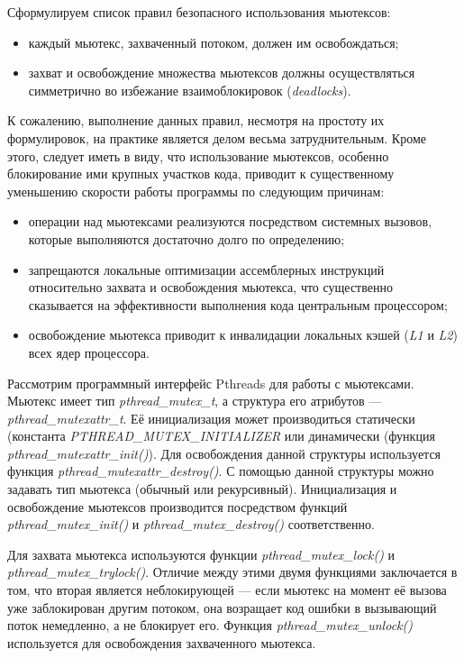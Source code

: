 Сформулируем список правил безопасного использования мьютексов:
\begin{itemize}
\item каждый мьютекс, захваченный потоком, должен им освобождаться;
\item захват и освобождение множества мьютексов должны осуществляться симметрично
  во избежание взаимоблокировок (\textit{deadlocks}).
\end{itemize}

К сожалению, выполнение данных правил, несмотря на простоту их формулировок,
на практике является делом весьма затруднительным.
Кроме этого, следует иметь в виду, что использование мьютексов,
особенно блокирование ими крупных участков кода, приводит к существенному
уменьшению скорости работы программы по следующим причинам:
\begin{itemize}
\item операции над мьютексами реализуются посредством системных вызовов,
  которые выполняются достаточно долго по определению;
\item запрещаются локальные оптимизации ассемблерных инструкций
  относительно захвата и освобождения мьютекса,
  что существенно сказывается на эффективности выполнения кода
  центральным процессором;
\item освобождение мьютекса приводит к инвалидации локальных кэшей
  (\textit{L1} и \textit{L2}) всех ядер процессора.
\end{itemize}

Рассмотрим программный интерфейс Pthreads для работы с мьютексами.
Мьютекс имеет тип \textit{pthread\_mutex\_t}, а структура его атрибутов ---
\textit{pthread\_mutexattr\_t}.
Её инициализация может производиться статически
(константа \textit{PTHREAD\_MUTEX\_INITIALIZER} или динамически
(функция \textit{pthread\_mutexattr\_init()}).
Для освобождения данной структуры используется функция
\textit{pthread\_mutexattr\_destroy()}.
С помощью данной структуры можно задавать тип мьютекса (обычный или рекурсивный).
Инициализация и освобождение мьютексов производится посредством
функций \textit{pthread\_mutex\_init()} и \textit{pthread\_mutex\_destroy()}
соответственно.

Для захвата мьютекса используются функции \textit{pthread\_mutex\_lock()}
и \textit{pthread\_mutex\_trylock()}. Отличие между этими двумя функциями
заключается в том, что вторая является неблокирующей --- если мьютекс на момент
её вызова уже заблокирован другим потоком, она возращает код ошибки в
вызывающий поток немедленно, а не блокирует его.
Функция \textit{pthread\_mutex\_unlock()} используется для освобождения
захваченного мьютекса.





